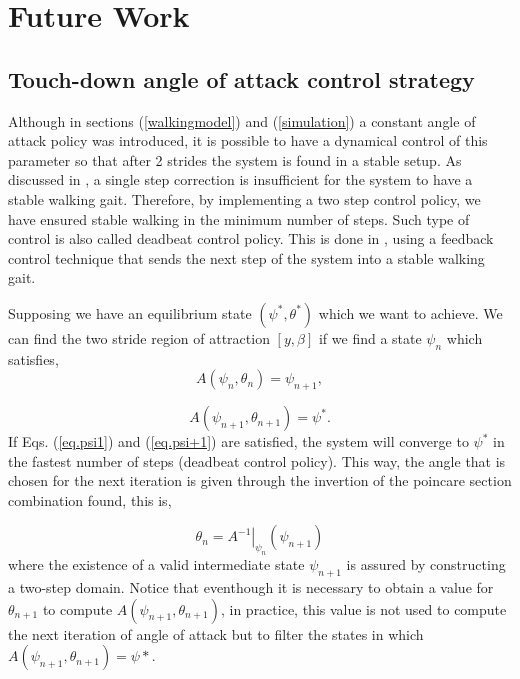 \section{Future Work}
\subsection{Touch-down angle of attack control strategy}\label{TDcontrol}
Although in sections (\ref{walkingmodel}) and (\ref{simulation}) a constant angle of attack policy was introduced, it is possible to have a dynamical control of this parameter so that after 2 strides the system is found in a stable setup.  As discussed in \cite{Carver2009}, a single step correction is insufficient for the system to have a stable walking gait. Therefore, by implementing a two step control policy, we have ensured stable walking in the minimum number of steps. Such type of control is also called deadbeat control policy. This is done in \cite{Vejdani2015}, using a feedback control technique that sends the next step of the system into a stable walking gait.

\par Supposing we have an equilibrium state $(\psi^*,\theta^*)$ which we want to achieve. We can find the two stride region of attraction $[y,\beta]$ if we find a state $\psi_n$ which satisfies,
\begin{equation}
  A(\psi_n,\theta_n)=\psi_{n+1},
  \label{eq.psi1}
  \end{equation}

\begin{equation}
  A(\psi_{n+1},\theta_{n+1})=\psi^*.
  \label{eq.psi+1}
\end{equation}
\noindent If Eqs. (\ref{eq.psi1}) and (\ref{eq.psi+1}) are satisfied, the system will converge to $\psi^*$ in the fastest number of steps (deadbeat control policy). This way, the angle that is chosen for the next iteration is given through the invertion of the poincare section combination found, this is, 

\begin{equation}
  \theta_n=\left.A^{-1}\right|_{\psi_n}(\psi_{n+1})
\end{equation}
where the existence of a valid intermediate state $\psi_{n+1}$ is assured by constructing a two-step domain. Notice that eventhough it is necessary to obtain a value for $\theta_{n+1}$ to compute $A(\psi_{n+1},\theta_{n+1})$, in practice, this value is not used to compute the next iteration of angle of attack but to filter the states in which $A(\psi_{n+1},\theta_{n+1})=\psi*$.



